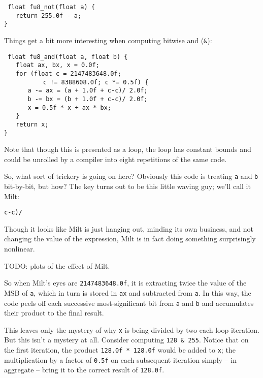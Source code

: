 \documentclass{acmsiggraph}
\theoremstyle{remark}
\theoremstyle{definition}
\begin{document}
{\tt
float fu8\_not(float a) \{ \\
$\phantom{XX}$return 255.0f - a; \\
\}
}

Things get a bit more interesting when computing bitwise and ({\tt \&}):

{\tt
float fu8\_and(float a, float b) \{ \\
$\phantom{XX}$float ax, bx, x = 0.0f; \\
$\phantom{XX}$for (float c = 2147483648.0f;\\
$\phantom{XXXXXX}$ c != 8388608.0f; c *= 0.5f) \{ \\
$\phantom{XXXX}$a -= ax = (a + 1.0f + c-c)/ 2.0f; \\
$\phantom{XXXX}$b -= bx = (b + 1.0f + c-c)/ 2.0f; \\
$\phantom{XXXX}$x = 0.5f * x + ax * bx; \\
$\phantom{XX}$\} \\
$\phantom{XX}$return x; \\
\}
}

Note that though this is presented as a loop, the loop has constant bounds and could be unrolled by a compiler into eight repetitions of the same code.

So, what sort of trickery is going on here?
Obviously this code is treating {\tt a} and {\tt b} bit-by-bit, but how?
The key turns out to be this little waving guy; we'll call it Milt:

\begin{center}
\huge
{\tt c-c)/}
\end{center}

Though it looks like Milt is just hanging out, minding its own business, and not changing the value of the expression,
Milt is in fact doing something surprisingly nonlinear.

TODO: plots of the effect of Milt.

So when Milt's eyes are {\tt 2147483648.0f}, it is extracting twice the value of the MSB of {\tt a},
which in turn is stored in {\tt ax} and subtracted from {\tt a}.
In this way, the code peels off each successive most-significant bit from {\tt a} and {\tt b} and accumulates their product to the final result.

This leaves only the mystery of why {\tt x} is being divided by two each loop iteration.
But this isn't a mystery at all.
Consider computing {\tt 128 \& 255}.
Notice that on the first iteration, the product {\tt 128.0f * 128.0f} would be added to {\tt x};
the multiplication by a factor of {\tt 0.5f} on each subsequent iteration simply -- in aggregate -- bring it to the correct result of {\tt 128.0f}.
\end{document}
